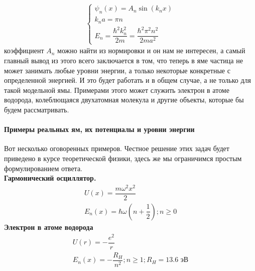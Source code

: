 \documentclass[12pt]{article}
\begin{document}
\begin{gather}
\label{eq:sem_04_energy_in_hole}
    \begin{cases}
         \psi_n(x) = A_n \sin(k_nx)\\
         k_na = \pi n\\[5pt]
         E_n = \dfrac{\hbar^2k_n^2}{2m} = \dfrac{\hbar^2\pi^2n^2}{2ma^2}
    \end{cases}
\end{gather}
коэффициент $A_n$ можно найти из нормировки и он нам не интересен, а самый главный вывод из этого всего заключается в том, что теперь в яме частица не может занимать любые уровни энергии, а только некоторые конкретные с определенной энергией. И это будет работать и в общем случае, а не только для такой модельной ямы. Примерами этого может служить электрон в атоме водорода, колеблющаяся двухатомная молекула и другие объекты, которые бы будем рассматривать.
\paragraph{Примеры реальных ям, их потенциалы и уровни энергии}
Вот несколько оговоренных примеров. Честное решение этих задач будет приведено в курсе теоретической физики, здесь же мы ограничимся простым формулированием ответа.\\
\textbf{Гармонический осциллятор.} 
\begin{gather*}
    U(x) = \dfrac{m\omega^2x^2}{2}\\
    E_n(x) = \hbar\omega(n+\dfrac{1}{2}); n\ge 0
\end{gather*}
\textbf{Электрон в атоме водорода} 
\begin{gather*}
    U(r) = -\dfrac{e^2}{r}\\
    E_n(x) = -\dfrac{R_H}{n^2}; n\ge 1; R_H = 13.6 \text{ эВ} 
\end{gather*}
\end{document}
